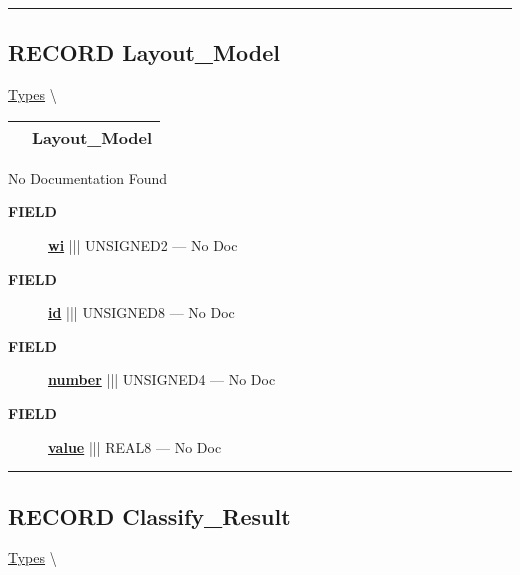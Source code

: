 \rule{\linewidth}{0.5pt}
\subsection*{\textsf{\colorbox{headtoc}{\color{white} RECORD}
Layout\_Model}}

\hypertarget{ecldoc:ml_core.types.layout_model}{}
\hspace{0pt} \hyperlink{ecldoc:ML_Core.Types}{Types} \textbackslash 

{\renewcommand{\arraystretch}{1.5}
\begin{tabularx}{\textwidth}{|>{\raggedright\arraybackslash}l|X|}
\hline
\hspace{0pt}\mytexttt{\color{red} } & \textbf{Layout\_Model} \\
\hline
\end{tabularx}
}

\par





No Documentation Found







\par
\begin{description}
\item [\colorbox{tagtype}{\color{white} \textbf{\textsf{FIELD}}}] \textbf{\underline{wi}} ||| UNSIGNED2 --- No Doc
\item [\colorbox{tagtype}{\color{white} \textbf{\textsf{FIELD}}}] \textbf{\underline{id}} ||| UNSIGNED8 --- No Doc
\item [\colorbox{tagtype}{\color{white} \textbf{\textsf{FIELD}}}] \textbf{\underline{number}} ||| UNSIGNED4 --- No Doc
\item [\colorbox{tagtype}{\color{white} \textbf{\textsf{FIELD}}}] \textbf{\underline{value}} ||| REAL8 --- No Doc
\end{description}





\rule{\linewidth}{0.5pt}
\subsection*{\textsf{\colorbox{headtoc}{\color{white} RECORD}
Classify\_Result}}

\hypertarget{ecldoc:ml_core.types.classify_result}{}
\hspace{0pt} \hyperlink{ecldoc:ML_Core.Types}{Types} \textbackslash 

